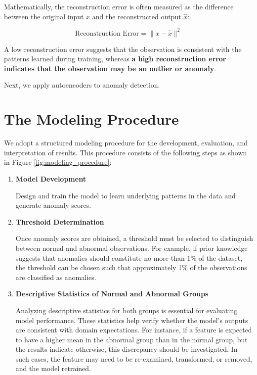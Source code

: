 Mathematically, the reconstruction error is often measured as the difference between the original input $x$ and the reconstructed output $\hat{x}$:

\[
\text{Reconstruction Error}
=
\|x-\hat{x}\|^2
\]

A low reconstruction error suggests that the observation is consistent with the patterns learned during training, whereas  \textbf{a high reconstruction error indicates that the observation may be an outlier or anomaly}.

Next, we apply autoencoders to anomaly detection.

\section{The Modeling Procedure}

We adopt a structured modeling procedure for the development, evaluation, and interpretation of results. This procedure consists of the following steps as shown in Figure \ref{fig:modeling_procedure}:

\begin{enumerate}
    \item \textbf{Model Development}
    
    Design and train the model to learn underlying patterns in the data and generate anomaly scores.
    
    \item \textbf{Threshold Determination}
    
    Once anomaly scores are obtained, a threshold must be selected to distinguish between normal and abnormal observations. For example, if prior knowledge suggests that anomalies should constitute no more than 1\% of the dataset, the threshold can be chosen such that approximately 1\% of the observations are classified as anomalies.
    
    \item \textbf{Descriptive Statistics of Normal and Abnormal Groups}
    
    Analyzing descriptive statistics for both groups is essential for evaluating model performance. These statistics help verify whether the model's outputs are consistent with domain expectations. For instance, if a feature is expected to have a higher mean in the abnormal group than in the normal group, but the results indicate otherwise, this discrepancy should be investigated. In such cases, the feature may need to be re-examined, transformed, or removed, and the model retrained.
\end{enumerate}


